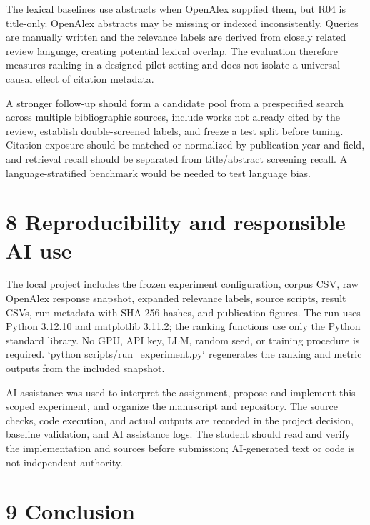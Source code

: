 \documentclass[acmsmall,nonacm]{acmart}
\begin{document}
The lexical baselines use abstracts when OpenAlex supplied them, but R04 is title-only. OpenAlex abstracts may be missing or indexed inconsistently. Queries are manually written and the relevance labels are derived from closely related review language, creating potential lexical overlap. The evaluation therefore measures ranking in a designed pilot setting and does not isolate a universal causal effect of citation metadata.\par

A stronger follow-up should form a candidate pool from a prespecified search across multiple bibliographic sources, include works not already cited by the review, establish double-screened labels, and freeze a test split before tuning. Citation exposure should be matched or normalized by publication year and field, and retrieval recall should be separated from title/abstract screening recall. A language-stratified benchmark would be needed to test language bias.\par

\section*{8 Reproducibility and responsible AI use}

The local project includes the frozen experiment configuration, corpus CSV, raw OpenAlex response snapshot, expanded relevance labels, source scripts, result CSVs, run metadata with SHA-256 hashes, and publication figures. The run uses Python 3.12.10 and matplotlib 3.11.2; the ranking functions use only the Python standard library. No GPU, API key, LLM, random seed, or training procedure is required. `python scripts/run\_experiment.py` regenerates the ranking and metric outputs from the included snapshot.\par

AI assistance was used to interpret the assignment, propose and implement this scoped experiment, and organize the manuscript and repository. The source checks, code execution, and actual outputs are recorded in the project decision, baseline validation, and AI assistance logs. The student should read and verify the implementation and sources before submission; AI-generated text or code is not independent authority.\par

\section*{9 Conclusion}
\end{document}
